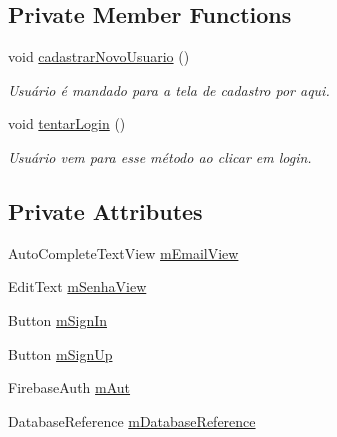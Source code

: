 \subsection*{Private Member Functions}
\begin{DoxyCompactItemize}
\item 
void \mbox{\hyperlink{classbr_1_1unb_1_1cic_1_1mp_1_1marketmaster_1_1MainActivity_a4ecb4aedefdc971d726de314d3643434}{cadastrar\+Novo\+Usuario}} ()
\begin{DoxyCompactList}\small\item\em Usuário é mandado para a tela de cadastro por aqui. \end{DoxyCompactList}\item 
void \mbox{\hyperlink{classbr_1_1unb_1_1cic_1_1mp_1_1marketmaster_1_1MainActivity_ac3b9836758854893a2495603ee47ea85}{tentar\+Login}} ()
\begin{DoxyCompactList}\small\item\em Usuário vem para esse método ao clicar em login. \end{DoxyCompactList}\end{DoxyCompactItemize}
\subsection*{Private Attributes}
\begin{DoxyCompactItemize}
\item 
Auto\+Complete\+Text\+View \mbox{\hyperlink{classbr_1_1unb_1_1cic_1_1mp_1_1marketmaster_1_1MainActivity_a5c34b434b5163b96fd13f102c7f297a2}{m\+Email\+View}}
\item 
Edit\+Text \mbox{\hyperlink{classbr_1_1unb_1_1cic_1_1mp_1_1marketmaster_1_1MainActivity_ae72d7908b8d46d47336a2600250ce960}{m\+Senha\+View}}
\item 
Button \mbox{\hyperlink{classbr_1_1unb_1_1cic_1_1mp_1_1marketmaster_1_1MainActivity_a5b3b9dfafda80ab2e9cddd0ebe01c70e}{m\+Sign\+In}}
\item 
Button \mbox{\hyperlink{classbr_1_1unb_1_1cic_1_1mp_1_1marketmaster_1_1MainActivity_a4313c9cd19e3f4a2af00de0aa33bd134}{m\+Sign\+Up}}
\item 
Firebase\+Auth \mbox{\hyperlink{classbr_1_1unb_1_1cic_1_1mp_1_1marketmaster_1_1MainActivity_a850f77b3b4da6eec0cbb3349b426c761}{m\+Aut}}
\item 
Database\+Reference \mbox{\hyperlink{classbr_1_1unb_1_1cic_1_1mp_1_1marketmaster_1_1MainActivity_aa26223cdf8b33fc21760c5396b36cf70}{m\+Database\+Reference}}
\end{DoxyCompactItemize}


